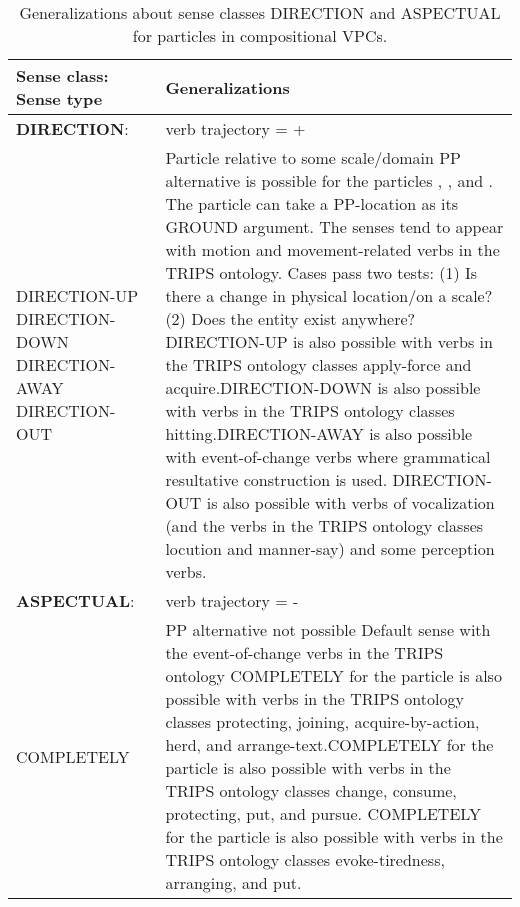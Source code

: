 \documentclass[output=paper,modfonts,nonflat]{langsci/langscibook}
\begin{document}
\begin{table}
\caption{Generalizations about sense classes DIRECTION and ASPECTUAL for particles in compositional VPCs. }
\label{tab:1:findings-prtcls-sense-classes}
\footnotesize
 \begin{tabularx}{\textwidth}{p{30mm}Q}
  \lsptoprule
   \textbf{Sense class}: \newline Sense type
        & Generalizations\\
    \midrule 
  \textbf{DIRECTION}:& verb trajectory = + \\
   DIRECTION-UP \newline DIRECTION-DOWN \newline DIRECTION-AWAY \newline DIRECTION-OUT
    & Particle relative to some scale/domain \newline PP alternative is possible for the particles , , and . \newline The particle  can take a PP-location as its GROUND argument. \newline The senses tend to appear with motion and movement-related verbs in the TRIPS ontology. \newline Cases pass two tests: (1) Is there a change in physical location/on a scale? (2) Does the entity exist anywhere? \newline DIRECTION-UP is also possible with verbs in the TRIPS ontology classes apply-force and acquire.\newline DIRECTION-DOWN is also possible with verbs in the TRIPS ontology classes hitting.\newline DIRECTION-AWAY is also possible with event-of-change verbs where grammatical resultative construction is used. \newline DIRECTION-OUT is also possible with verbs of vocalization (and the verbs in the TRIPS ontology classes locution and manner-say) and some perception verbs. \\
\tablevspace
  \textbf{ASPECTUAL}:&verb trajectory = -  \\ 
   COMPLETELY
    &   PP alternative not possible \newline Default sense with the event-of-change verbs in the TRIPS ontology \newline COMPLETELY for the particle  is also possible with verbs in the TRIPS ontology classes protecting, joining, acquire-by-action, herd, and arrange-text.\newline COMPLETELY for the particle  is also possible with verbs in the TRIPS ontology classes change, consume, protecting, put, and pursue. \newline COMPLETELY for the particle  is also possible with verbs in the TRIPS ontology classes evoke-tiredness, arranging, and put.\\

\end{tabularx}
\end{table}
\end{document}
